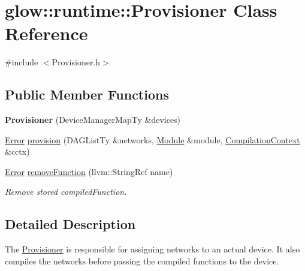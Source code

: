 \hypertarget{classglow_1_1runtime_1_1_provisioner}{}\section{glow\+:\+:runtime\+:\+:Provisioner Class Reference}
\label{classglow_1_1runtime_1_1_provisioner}


{\ttfamily \#include $<$Provisioner.\+h$>$}

\subsection*{Public Member Functions}
\begin{DoxyCompactItemize}
\item 
\mbox{\label{classglow_1_1runtime_1_1_provisioner_a3402b1aa860c7011c8b6efe0df15dfec}} 
{\bfseries Provisioner} (Device\+Manager\+Map\+Ty \&devices)
\item 
\hyperlink{namespaceglow_afdb176c3a672ef66db0ecfc19a8d39bf}{Error} \hyperlink{classglow_1_1runtime_1_1_provisioner_a6a8d183987f99cddcce7abfa90119ffd}{provision} (D\+A\+G\+List\+Ty \&networks, \hyperlink{classglow_1_1_module}{Module} \&module, \hyperlink{structglow_1_1_compilation_context}{Compilation\+Context} \&cctx)
\item 
\mbox{\label{classglow_1_1runtime_1_1_provisioner_a90ec18a4e7552f4145ac0b3dec34ef65}} 
\hyperlink{namespaceglow_afdb176c3a672ef66db0ecfc19a8d39bf}{Error} \hyperlink{classglow_1_1runtime_1_1_provisioner_a90ec18a4e7552f4145ac0b3dec34ef65}{remove\+Function} (llvm\+::\+String\+Ref name)
\begin{DoxyCompactList}\small\item\em Remove stored compiled\+Function. \end{DoxyCompactList}\end{DoxyCompactItemize}


\subsection{Detailed Description}
The \hyperlink{classglow_1_1runtime_1_1_provisioner}{Provisioner} is responsible for assigning networks to an actual device. It also compiles the networks before passing the compiled functions to the device. 

